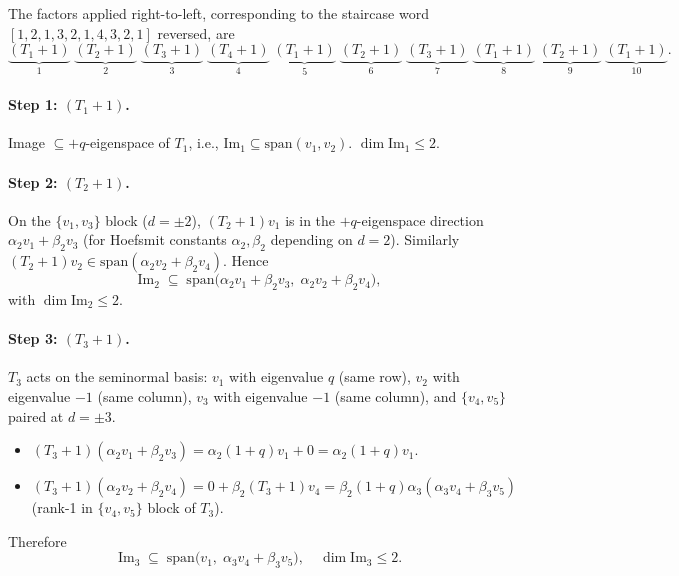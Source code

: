 \documentclass[11pt]{article}
\theoremstyle{definition}
\begin{document}
The factors applied right-to-left, corresponding to the staircase word
$[1, 2, 1, 3, 2, 1, 4, 3, 2, 1]$ reversed, are
\[
\underbrace{(T_1{+}1)}_{1}\;
\underbrace{(T_2{+}1)}_{2}\;
\underbrace{(T_3{+}1)}_{3}\;
\underbrace{(T_4{+}1)}_{4}\;
\underbrace{(T_1{+}1)}_{5}\;
\underbrace{(T_2{+}1)}_{6}\;
\underbrace{(T_3{+}1)}_{7}\;
\underbrace{(T_1{+}1)}_{8}\;
\underbrace{(T_2{+}1)}_{9}\;
\underbrace{(T_1{+}1)}_{10}.
\]

\paragraph{Step 1: $(T_1{+}1)$.} Image $\subseteq +q$-eigenspace
of $T_1$, i.e., $\mathrm{Im}_1 \subseteq \mathrm{span}(v_1, v_2)$.
$\dim \mathrm{Im}_1 \leq 2$.

\paragraph{Step 2: $(T_2{+}1)$.}
On the $\{v_1, v_3\}$ block ($d=\pm 2$), $(T_2{+}1) v_1$ is in the
$+q$-eigenspace direction $\alpha_2 v_1 + \beta_2 v_3$
(for Hoefsmit constants $\alpha_2, \beta_2$ depending on $d=2$).
Similarly $(T_2{+}1) v_2 \in \mathrm{span}(\alpha_2 v_2 + \beta_2 v_4)$.
Hence
\[
\mathrm{Im}_2 \;\subseteq\; \mathrm{span}\bigl(\alpha_2 v_1 + \beta_2 v_3,\;
                                    \alpha_2 v_2 + \beta_2 v_4\bigr),
\]
with $\dim \mathrm{Im}_2 \leq 2$.

\paragraph{Step 3: $(T_3{+}1)$.}
$T_3$ acts on the seminormal basis: $v_1$ with eigenvalue $q$ (same row),
$v_2$ with eigenvalue $-1$ (same column), $v_3$ with eigenvalue $-1$
(same column), and $\{v_4, v_5\}$ paired at $d=\pm 3$.
\begin{itemize}[topsep=0.3em,itemsep=0.2em,leftmargin=2em]
\item $(T_3{+}1)(\alpha_2 v_1 + \beta_2 v_3)
= \alpha_2 (1{+}q) v_1 + 0 = \alpha_2(1{+}q) v_1$.
\item $(T_3{+}1)(\alpha_2 v_2 + \beta_2 v_4)
= 0 + \beta_2 (T_3{+}1) v_4
= \beta_2 (1{+}q)\alpha_3 (\alpha_3 v_4 + \beta_3 v_5)$
(rank-1 in $\{v_4, v_5\}$ block of $T_3$).
\end{itemize}
Therefore
\[
\mathrm{Im}_3 \;\subseteq\;
\mathrm{span}\bigl(v_1,\; \alpha_3 v_4 + \beta_3 v_5\bigr),
\quad \dim \mathrm{Im}_3 \leq 2.
\]
\end{document}
